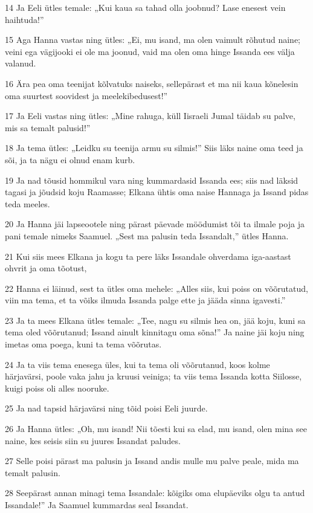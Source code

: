 \par 14 Ja Eeli ütles temale: „Kui kaua sa tahad olla joobnud? Lase enesest vein haihtuda!”
\par 15 Aga Hanna vastas ning ütles: „Ei, mu isand, ma olen vaimult rõhutud naine; veini ega vägijooki ei ole ma joonud, vaid ma olen oma hinge Issanda ees välja valanud.
\par 16 Ära pea oma teenijat kõlvatuks naiseks, sellepärast et ma nii kaua kõnelesin oma suurtest soovidest ja meelekibedusest!”
\par 17 Ja Eeli vastas ning ütles: „Mine rahuga, küll Iisraeli Jumal täidab su palve, mis sa temalt palusid!”
\par 18 Ja tema ütles: „Leidku su teenija armu su silmis!” Siis läks naine oma teed ja sõi, ja ta nägu ei olnud enam kurb.
\par 19 Ja nad tõusid hommikul vara ning kummardasid Issanda ees; siis nad läksid tagasi ja jõudsid koju Raamasse; Elkana ühtis oma naise Hannaga ja Issand pidas teda meeles.
\par 20 Ja Hanna jäi lapseootele ning pärast päevade möödumist tõi ta ilmale poja ja pani temale nimeks Saamuel. „Sest ma palusin teda Issandalt,” ütles Hanna.
\par 21 Kui siis mees Elkana ja kogu ta pere läks Issandale ohverdama iga-aastast ohvrit ja oma tõotust,
\par 22 Hanna ei läinud, sest ta ütles oma mehele: „Alles siis, kui poiss on võõrutatud, viin ma tema, et ta võiks ilmuda Issanda palge ette ja jääda sinna igavesti.”
\par 23 Ja ta mees Elkana ütles temale: „Tee, nagu su silmis hea on, jää koju, kuni sa tema oled võõrutanud; Issand ainult kinnitagu oma sõna!” Ja naine jäi koju ning imetas oma poega, kuni ta tema võõrutas.
\par 24 Ja ta viis tema enesega üles, kui ta tema oli võõrutanud, koos kolme härjavärsi, poole vaka jahu ja kruusi veiniga; ta viis tema Issanda kotta Siilosse, kuigi poiss oli alles nooruke.
\par 25 Ja nad tapsid härjavärsi ning tõid poisi Eeli juurde.
\par 26 Ja Hanna ütles: „Oh, mu isand! Nii tõesti kui sa elad, mu isand, olen mina see naine, kes seisis siin su juures Issandat paludes.
\par 27 Selle poisi pärast ma palusin ja Issand andis mulle mu palve peale, mida ma temalt palusin.
\par 28 Seepärast annan minagi tema Issandale: kõigiks oma elupäeviks olgu ta antud Issandale!” Ja Saamuel kummardas seal Issandat.

